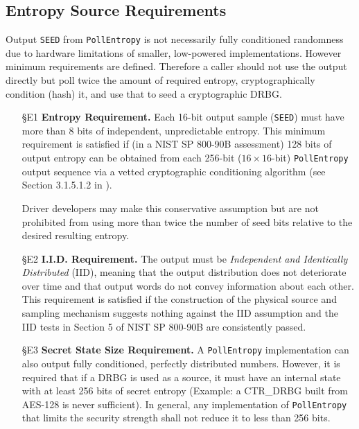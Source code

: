 {\subsection{Entropy Source Requirements}
\label{sec:req-es}
\label{sec:req-entropy}
\label{sec:req-iid}
\label{sec:req-state}

    Output \verb|SEED| from \verb|PollEntropy| is not necessarily fully
    conditioned randomness due to hardware limitations of smaller,
    low-powered implementations. However minimum requirements are
    defined. Therefore a caller should not use the output directly but poll
    twice the amount of required entropy, cryptographically condition
    (hash) it, and use that to seed a cryptographic DRBG.

    \begin{itemize}

    \item[\S E1]    {\bf Entropy Requirement.}
    Each 16-bit output sample (\verb|SEED|) must have more than 8 bits of
    independent, unpredictable entropy. This minimum requirement is
    satisfied if (in a NIST SP 800-90B \cite{TuBaKe+18} assessment) 128
    bits of output entropy can be obtained from each 256-bit
    ($16 \times 16$-bit) \verb|PollEntropy| output sequence via a vetted
    cryptographic conditioning algorithm (see Section 3.1.5.1.2 in
    \cite{TuBaKe+18}).

    Driver developers may make this conservative assumption but are not
    prohibited from using more than twice the number of seed bits relative
    to the desired resulting entropy.

    \item[\S E2]    {\bf I.I.D. Requirement.}
    The output must be \emph{Independent and Identically Distributed}
    (IID), meaning that the output distribution does not deteriorate over
    time and that output words do not convey information about each other.
    This requirement is satisfied if the construction of the physical source
    and sampling mechanism suggests nothing against the IID assumption
    and the IID tests in Section 5 of NIST SP 800-90B \cite{TuBaKe+18} are
    consistently passed.

    \item[\S E3]    {\bf Secret State Size Requirement.}
    A \verb|PollEntropy| implementation can also output fully conditioned,
    perfectly distributed numbers. However, it is required that if a DRBG is
    used as a source, it must have an internal state with at least 256 bits
    of secret entropy (Example: a CTR\_DRBG built from AES-128 is never
    sufficient). In general, any implementation of \verb|PollEntropy| that
    limits the security strength shall not reduce it to less than 256 bits.


\end{itemize}}

